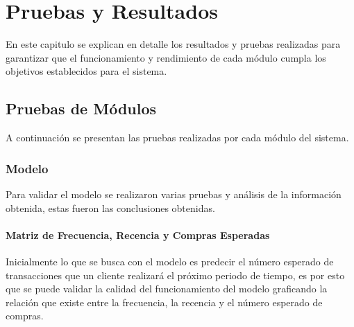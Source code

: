 
\chapter{Pruebas y Resultados}

En este capitulo se explican en detalle los resultados y pruebas realizadas para garantizar que el funcionamiento y rendimiento de cada módulo cumpla los objetivos establecidos para el sistema.

\section{Pruebas de Módulos}

A continuación se presentan las pruebas realizadas por cada módulo del sistema.

\subsection{Modelo}

Para validar el modelo se realizaron varias pruebas y análisis de la información obtenida, estas fueron las conclusiones obtenidas.

\subsubsection{Matriz de Frecuencia, Recencia y Compras Esperadas}

Inicialmente lo que se busca con el modelo es predecir el número esperado de transacciones que un cliente realizará el próximo periodo de tiempo, es por esto que se puede validar la calidad del funcionamiento del modelo graficando la relación que existe entre la frecuencia, la recencia y el número esperado de compras.

